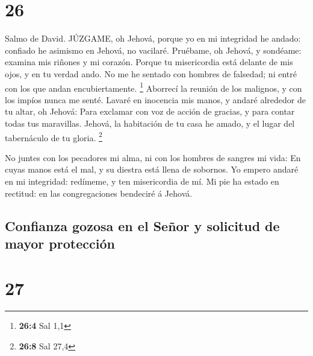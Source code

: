 \hypertarget{section-25}{%
\section{26}\label{section-25}}

 Salmo de David. JÚZGAME, oh Jehová, porque yo en mi
integridad he andado: confiado he asimismo en Jehová, no vacilaré.
 Pruébame, oh Jehová, y sondéame: examina mis riñones y mi
corazón.  Porque tu misericordia está delante de mis ojos, y
en tu verdad ando.  No me he sentado con hombres de
falsedad; ni entré con los que andan encubiertamente. \footnote{\textbf{26:4}
  Sal 1,1}  Aborrecí la reunión de los malignos, y con los
impíos nunca me senté.  Lavaré en inocencia mis manos, y
andaré alrededor de tu altar, oh Jehová:  Para exclamar con
voz de acción de gracias, y para contar todas tus maravillas.
 Jehová, la habitación de tu casa he amado, y el lugar del
tabernáculo de tu gloria. \footnote{\textbf{26:8} Sal 27,4}

 No juntes con los pecadores mi alma, ni con los hombres de
sangres mi vida:  En cuyas manos está el mal, y su diestra
está llena de sobornos.  Yo empero andaré en mi integridad:
redímeme, y ten misericordia de mí.  Mi pie ha estado en
rectitud: en las congregaciones bendeciré á Jehová.

\hypertarget{confianza-gozosa-en-el-seuxf1or-y-solicitud-de-mayor-protecciuxf3n}{%
\subsection{Confianza gozosa en el Señor y solicitud de mayor
protección}\label{confianza-gozosa-en-el-seuxf1or-y-solicitud-de-mayor-protecciuxf3n}}

\hypertarget{section-26}{%
\section{27}\label{section-26}}

